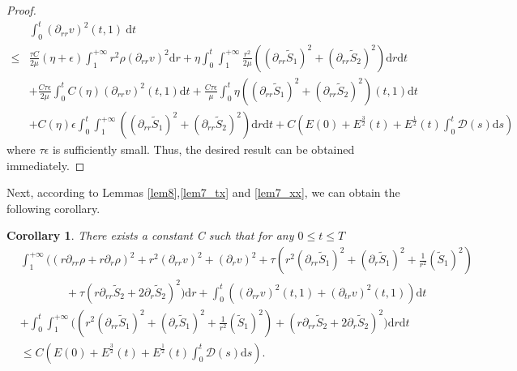 \documentclass[10pt,reqno]{amsart}
\numberwithin{equation}{section}
\newtheorem{corollary}[theorem]{Corollary}
\begin{document}
\begin{proof}
		\begin{equation}
		\begin{aligned}\label{82}
				&\int_{0}^{t}(\partial_{rr} v)^2(t,1)\mathrm{~d}t \\
				\leq& 
				\frac{\tau C}{2\mu}(\eta+\epsilon)\int_{1}^{+\infty} r^2\rho(\partial_{rr}v)^2\mathrm{d}r +\eta\int_{0}^{t}\int_{1}^{+\infty}\frac{r^2}{2\mu}\left((\partial_{rr}\tilde{S}_1)^2+(\partial_{rr}\tilde{S}_2)^2\right)\mathrm{d}r\mathrm{d}t \\&
				+\frac{C\tau\epsilon}{2\mu}\int_{0}^{t}C(\eta)(\partial_{rr}v)^2(t,1)\mathrm{d}t
				+\frac{C\tau\epsilon}{\mu}\int_{0}^{t}\eta\left(
				(\partial_{rr} \tilde{S}_1)^2+(\partial_{rr} \tilde{S}_2)^2\right)(t,1)\mathrm{d}t \\&
				+C(\eta)\epsilon\int_{0}^{t}\int_{1}^{+\infty}\left((\partial_{rr} \tilde{S}_1)^2+(\partial_{rr} \tilde{S}_2)^2\right)\mathrm{d}r\mathrm{d}t
				+C\left(E(0)+ E^{\frac{3}{2}}(t)+ E^{\frac{1}{2}}(t) \int_{0}^{t}\mathcal{D}(s)\mathrm{d}s\right)
		\end{aligned}
		\end{equation}
	where \(\tau\epsilon\) is sufficiently small. Thus, the desired result can be obtained immediately.
	\end{proof}
	
	Next, according to Lemmas \ref{lem8},\ref{lem7_tx} and \ref{lem7_xx}, we can obtain the following corollary.
	\begin{corollary}\label{cor1}
		There exists a constant C such that for any $0\leq t \leq T$
		\begin{equation}
			\begin{aligned}
				&\int_{1}^{+\infty}\bigg(\left(r\partial_{rr} \rho+r\partial_{r} \rho\right)^2
				+r^2 (\partial_{rr}v)^2+(\partial_{r}v)^2
				+\tau\left(r^2(\partial_{rr}\tilde{S}_1)^2+(\partial_{r}\tilde{S}_1)^2+\frac{1}{ r^2}(\tilde{S}_1)^2\right)\\
				&\qquad\qquad
				+\tau\left(r\partial_{rr} \tilde{S}_2+2\partial_{r} \tilde{S}_2\right)^2\bigg)\mathrm{d}r
				+\int_{0}^{t}\left((\partial_{rr}v)^2(t,1)+(\partial_{tr}v)^2(t,1)
				\right)\mathrm{d}t\\
				&+\int_0^t\int_{1}^{+\infty}\bigg((r^2(\partial_{rr}\tilde{S}_1)^2+(\partial_{r}\tilde{S}_1)^2+\frac{1}{ r^2}(\tilde{S}_1)^2)
				+\left(r\partial_{rr} \tilde{S}_2+2\partial_{r} \tilde{S}_2\right)^2\bigg)\mathrm{d}r\mathrm{d}t\\
				&\leq C \left(E(0)+E^{\frac{3}{2}}(t)+E^{\frac{1}{2}}(t) \int_{0}^{t}\mathcal{D}(s)\mathrm{d}s\right).	
			\end{aligned}
		\end{equation}
	\end{corollary}
	
\end{document}
